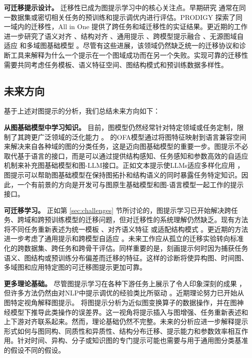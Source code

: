 \textbf{可迁移提示设计。}
迁移性已成为图提示学习中的核心关注点。早期研究 \cite{liu2023graphprompt, sun2022gppt, gong2023prompt, fang2023universal, fang2022prompt, ge2023enhancing} 通常在同一数据集或密切相关任务的预训练和提示调优内进行评估。PRODIGY \cite{huang2023prodigy} 探索了同一域内的迁移性，All in One \cite{sun2023all} 提供了跨任务和域迁移性的实证结果。更近期的工作进一步研究了语义对齐 \cite{zhu2023graphcontrol}、结构对齐 \cite{zhao2023graphglow}、通用提示 \cite{huang2025oneprompt}、跨模型提示融合 \cite{he2026gp2f}、无源图域自适应 \cite{zhang2024collaborate} 和多域图基础模型 \cite{wang2025multidomain, yu2025samgpt}。尽管有这些进展，该领域仍然缺乏统一的迁移协议和诊断工具来解释为什么一个提示在一个图域成功而在另一个失败。实现可靠的迁移性需要共同考虑任务模板、语义特征空间、图结构模式和预训练数据多样性。

\subsection{未来方向}
基于上述对图提示的分析，我们总结未来方向如下：

\textbf{从图基础模型中学习知识。} 目前，图模型仍然经常针对特定领域或任务定制，限制了其跨更广泛领域的泛化能力 \cite{liu2023graph, zhu2023graphcontrol}。\citet{liu2023one} 的OFA模型通过将图特征映射到语言兼容空间来解决来自各种域的图的分类任务，这是迈向图基础模型的重要一步。图提示不必取代基于语言的接口，而是可以通过提供结构感知、任务感知和参数高效的自适应机制来补充图基础模型和图-LLM接口。正如文本提示使LLMs适应多样化应用 \cite{robinson2023leveraging, wang2023knowledge, brown2020language}，图提示可以帮助图基础模型在保持图拓扑和结构语义的同时暴露任务特定知识。因此，一个有前景的方向是开发可与图原生基础模型和图-语言模型一起工作的提示接口。

\textbf{可迁移学习。} 正如第 \ref{sec:challenges} 节所讨论的，图提示学习已开始解决跨任务、跨域和跨预训练模型的迁移问题，但对迁移性的系统理解仍然缺乏。现有方法将不同任务重新表述为统一模板 \cite{sun2023all, huang2023prodigy}、对齐语义特征 \cite{zhu2023graphcontrol}或适配结构模式 \cite{zhao2023graphglow}。更近期的方法进一步考虑了通用提示和跨模型自适应 \cite{huang2025oneprompt, he2026gp2f}。未来工作应从孤立的迁移实验转向标准化的跨数据集、跨任务和跨骨干评估。同样重要的是，刻画提示何时因为捕获任务语义、图结构或预训练分布偏差而迁移的特征。这样的诊断将使异构图、时间图、多域图和应用特定图的可迁移图提示更加可靠。


\textbf{更多理论基础。} 尽管图提示学习在各种下游任务上展示了令人印象深刻的成果 \cite{guo2023datacentric, wen2023voucher, yang2023empirical}，但许多方法仍然由对NLP中提示调优的经验类比所驱动 \cite{liu2022ptuning, brown2020language, gao2021making, tsimpoukelli2021multimodal, qin2021learning, shin2020autoprompt}。近期理论努力已开始从图特定视角解释图提示。\citet{wang2025does} 将图提示分析为近似图变换算子的数据操作，并在图神经模型下推导此类操作的误差界。这一视角将提示插入与图增强、任务重新表述和上下游对齐联系起来。然而，理论基础仍然不完整。未来的分析应进一步解释提示形式如何与图同构、同质性和异质性、结构分布迁移、提示能力和参数效率相互作用。针对时间、异构、分子或知识图的专门提示可能也需要与用于通用图分类基准的假设不同的假设。


